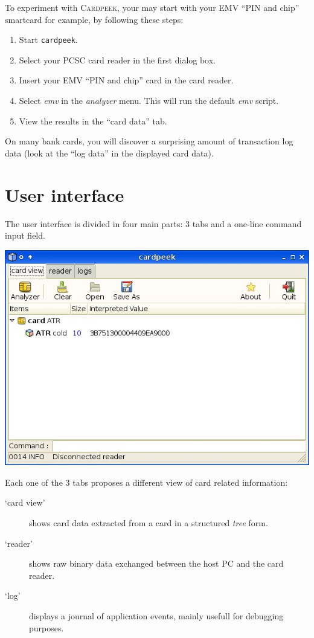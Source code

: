\documentclass[11pt]{report}
\newcommand{\Cardpeek}{\textsc{Cardpeek}}
\begin{document}
To experiment with \Cardpeek, your may start with your EMV ``PIN and chip'' smartcard for example, 
by following these steps:
\begin{enumerate}
\item{Start \texttt{cardpeek}.}
\item{Select your PCSC card reader in the first dialog box.}
\item{Insert your EMV ``PIN and chip'' card in the card reader.}
\item{Select \emph{emv} in the \emph{analyzer} menu. This will run the default \emph{emv} script.}
\item{View the results in the ``card data'' tab.}
\end{enumerate}

On many bank cards, you will discover a surprising amount of transaction log data (look at the ``log data'' 
in the displayed card data).

\section{User interface}

The user interface is divided in four main parts: 3 tabs and a one-line command input field.

\begin{center}
\includegraphics[width=.75\textwidth]{graphics/sample-blank.jpg}
\end{center}

Each one of the 3 tabs proposes a different view of card related information:
\begin{description}
\item[`card view']{shows card data extracted from a card in a structured \emph{tree} form.}  
\item[`reader']{shows raw binary data exchanged between the host PC and the card reader.}
\item[`log']{displays a journal of application events, mainly usefull for debugging purposes.}  
\end{description}
\end{document}
